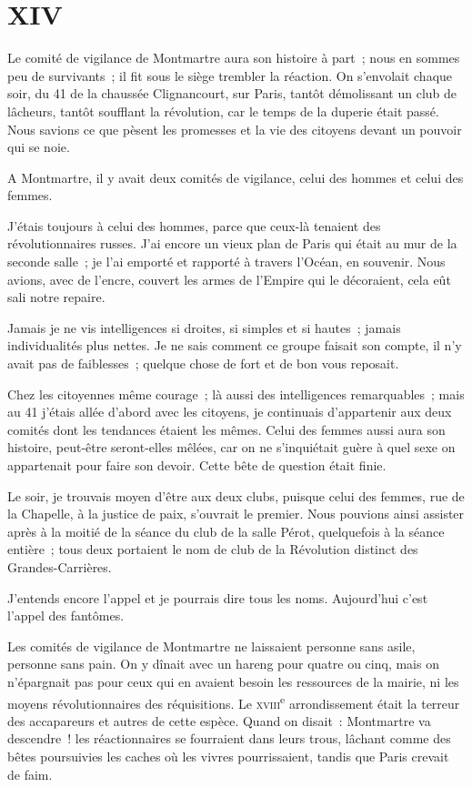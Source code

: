 \documentclass[french,twoside]{book} %
\newcommand\chapteropen{} %
\newcommand\chaptercont{} %
\begin{document}
\chapteropen
 \chapter[{XIV}]{XIV}
\label{p1.14}

\chaptercont
\noindent Le comité de vigilance de Montmartre aura son histoire à part ; nous en sommes peu de survivants ; il fit sous le siège trembler la réaction. On s’envolait chaque soir, du 41 de la chaussée Clignancourt, sur Paris, tantôt démolissant un club de lâcheurs, tantôt soufflant la révolution, car le temps de la duperie était passé. Nous savions ce que pèsent les promesses et la vie des citoyens devant un pouvoir qui se noie.\par
A Montmartre, il y avait deux comités de vigilance, celui des hommes et celui des femmes.\par
J’étais toujours à celui des hommes, parce que ceux-là tenaient des révolutionnaires russes. J’ai encore un vieux plan de Paris qui était au mur de la seconde salle ; je l’ai emporté et rapporté à travers l’Océan, en souvenir. Nous avions, avec de l’encre, couvert les armes de l’Empire qui le décoraient, cela eût sali notre repaire.\par
 Jamais je ne vis intelligences si droites, si simples et si hautes ; jamais individualités plus nettes. Je ne sais comment ce groupe faisait son compte, il n’y avait pas de faiblesses ; quelque chose de fort et de bon vous reposait.\par
Chez les citoyennes même courage ; là aussi des intelligences remarquables ; mais au 41 j’étais allée d’abord avec les citoyens, je continuais d’appartenir aux deux comités dont les tendances étaient les mêmes. Celui des femmes aussi aura son histoire, peut-être seront-elles mêlées, car on ne s’inquiétait guère à quel sexe on appartenait pour faire son devoir. Cette bête de question était finie.\par
Le soir, je trouvais moyen d’être aux deux clubs, puisque celui des femmes, rue de la Chapelle, à la justice de paix, s’ouvrait le premier. Nous pouvions ainsi assister après à la moitié de la séance du club de la salle Pérot, quelquefois à la séance entière ; tous deux portaient le nom de club de la Révolution distinct des Grandes-Carrières.\par
J’entends encore l’appel et je pourrais dire tous les noms. Aujourd’hui c’est l’appel des fantômes.\par
Les comités de vigilance de Montmartre ne laissaient personne sans asile, personne sans  pain. On y dînait avec un hareng pour quatre ou cinq, mais on n’épargnait pas pour ceux qui en avaient besoin les ressources de la mairie, ni les moyens révolutionnaires des réquisitions. Le {\scshape xviii}\textsuperscript{e} arrondissement était la terreur des accapareurs et autres de cette espèce. Quand on disait : Montmartre va descendre ! les réactionnaires se fourraient dans leurs trous, lâchant comme des bêtes poursuivies les caches où les vivres pourrissaient, tandis que Paris crevait de faim.\par
\end{document}
